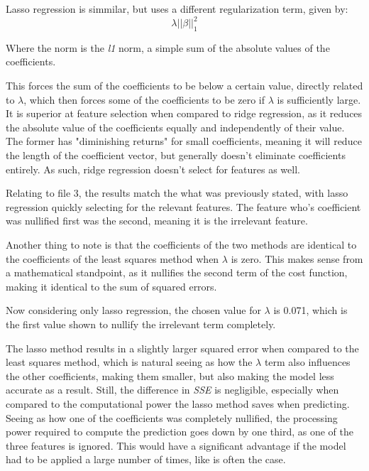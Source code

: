 \documentclass[a4paper,2pt]{report}
\begin{document}
    \par Lasso regression is simmilar, but uses a different regularization term, given by: 
    \begin{equation}
        \lambda||\beta||_1^2
    \end{equation}
    \par Where the norm is the \textit{l1} norm, a simple sum of the absolute values of the coefficients.

    \par This forces the sum of the coefficients to be below a certain value, directly related to \(\lambda\), which then forces some of the coefficients to be zero if \(\lambda\) is sufficiently large. It is superior at feature selection when compared to ridge regression, as it reduces the absolute value of the coefficients equally and independently of their value. The former has "diminishing returns" for small coefficients, meaning it will reduce the length of the coefficient vector, but generally doesn't eliminate coefficients entirely. As such, ridge regression doesn't select for features as well.

    \par Relating to file 3, the results match the what was previously stated, with lasso regression quickly selecting for the relevant features. The feature who's coefficient was nullified first was the second, meaning it is the irrelevant feature.
    \par Another thing to note is that the coefficients of the two methods are identical to the coefficients of the least squares method when \(\lambda\) is zero. This makes sense from a mathematical standpoint, as it nullifies the second term of the cost function, making it identical to the sum of squared errors.

    \par Now considering only lasso regression, the chosen value for \(\lambda\) is 0.071, which is the first value shown to nullify the irrelevant term completely.
    \par The lasso method results in a slightly larger squared error when compared to the least squares method, which is natural seeing as how the \(\lambda\) term also influences the other coefficients, making them smaller, but also making the model less accurate as a result. Still, the difference in \textit{SSE} is negligible, especially when compared to the computational power the lasso method saves when predicting. Seeing as how one of the coefficients was completely nullified, the processing power required to compute the prediction goes down by one third, as one of the three features is ignored. This would have a significant advantage if the model had to be applied a large number of times, like is often the case.
\end{document}
